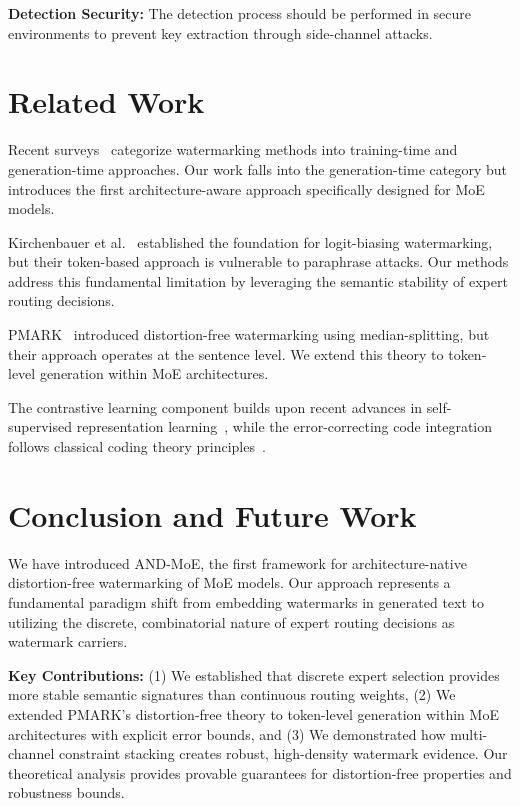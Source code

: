 \documentclass[letterpaper,twocolumn,10pt]{article}
\begin{document}
\textbf{Detection Security:} The detection process should be performed in secure environments to prevent key extraction through side-channel attacks.

\section{Related Work}

Recent surveys~\cite{christ2023watermarking,li2023survey} categorize watermarking methods into training-time and generation-time approaches. Our work falls into the generation-time category but introduces the first architecture-aware approach specifically designed for MoE models.

Kirchenbauer et al.~\cite{kirchenbauer2023watermark} established the foundation for logit-biasing watermarking, but their token-based approach is vulnerable to paraphrase attacks. Our methods address this fundamental limitation by leveraging the semantic stability of expert routing decisions.

PMARK~\cite{pmark2024} introduced distortion-free watermarking using median-splitting, but their approach operates at the sentence level. We extend this theory to token-level generation within MoE architectures.

The contrastive learning component builds upon recent advances in self-supervised representation learning~\cite{chen2020simple}, while the error-correcting code integration follows classical coding theory principles~\cite{macwilliams1977theory}.

\section{Conclusion and Future Work}

We have introduced AND-MoE, the first framework for architecture-native distortion-free watermarking of MoE models. Our approach represents a fundamental paradigm shift from embedding watermarks in generated text to utilizing the discrete, combinatorial nature of expert routing decisions as watermark carriers.

\textbf{Key Contributions:} (1) We established that discrete expert selection provides more stable semantic signatures than continuous routing weights, (2) We extended PMARK's distortion-free theory to token-level generation within MoE architectures with explicit error bounds, and (3) We demonstrated how multi-channel constraint stacking creates robust, high-density watermark evidence. Our theoretical analysis provides provable guarantees for distortion-free properties and robustness bounds.
\end{document}
